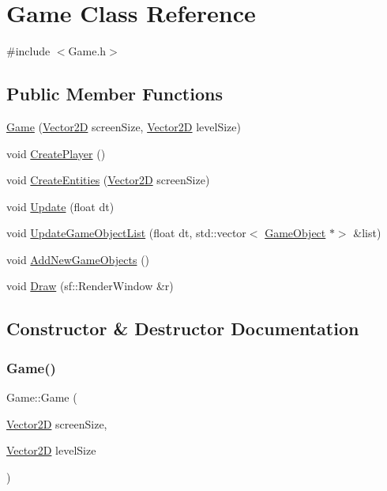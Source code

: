 \hypertarget{class_game}{}\section{Game Class Reference}
\label{class_game}


{\ttfamily \#include $<$Game.\+h$>$}

\subsection*{Public Member Functions}
\begin{DoxyCompactItemize}
\item 
\hyperlink{class_game_a9bf2dbc3669824fc9c0f86dbd5214ca8}{Game} (\hyperlink{class_vector2_d}{Vector2D} screen\+Size, \hyperlink{class_vector2_d}{Vector2D} level\+Size)
\item 
void \hyperlink{class_game_afa49214cd196fb9551341a84a8b45b4d}{Create\+Player} ()
\item 
void \hyperlink{class_game_a18399e8a53681f9cd22f969436ba151b}{Create\+Entities} (\hyperlink{class_vector2_d}{Vector2D} screen\+Size)
\item 
void \hyperlink{class_game_a4fa950db9b7e597d8b2595113a5629d2}{Update} (float dt)
\item 
void \hyperlink{class_game_af078573dbb338a48bfc485db6a92112d}{Update\+Game\+Object\+List} (float dt, std\+::vector$<$ \hyperlink{class_game_object}{Game\+Object} $\ast$$>$ \&list)
\item 
void \hyperlink{class_game_a5d49a201e628d0f6d5065260e8a429e1}{Add\+New\+Game\+Objects} ()
\item 
void \hyperlink{class_game_a43a5883ac1b2504aac1fdcffe8e8a897}{Draw} (sf\+::\+Render\+Window \&r)
\end{DoxyCompactItemize}


\subsection{Constructor \& Destructor Documentation}
\hypertarget{class_game_a9bf2dbc3669824fc9c0f86dbd5214ca8}{}\label{class_game_a9bf2dbc3669824fc9c0f86dbd5214ca8} 
\subsubsection{\texorpdfstring{Game()}{Game()}}
{\footnotesize\ttfamily Game\+::\+Game (\begin{DoxyParamCaption}\item[{\hyperlink{class_vector2_d}{Vector2D}}]{screen\+Size,  }\item[{\hyperlink{class_vector2_d}{Vector2D}}]{level\+Size }\end{DoxyParamCaption})}



